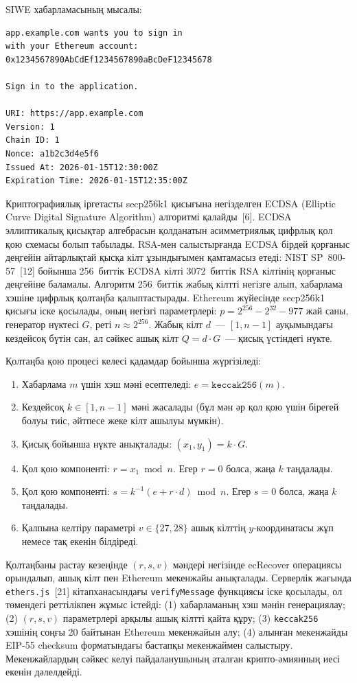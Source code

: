 \documentclass[14pt,a4paper]{extarticle}
\begin{document}
SIWE хабарламасының мысалы:
\begin{verbatim}
app.example.com wants you to sign in
with your Ethereum account:
0x1234567890AbCdEf1234567890aBcDeF12345678

Sign in to the application.

URI: https://app.example.com
Version: 1
Chain ID: 1
Nonce: a1b2c3d4e5f6
Issued At: 2026-01-15T12:30:00Z
Expiration Time: 2026-01-15T12:35:00Z
\end{verbatim}

Криптографиялық іргетасты secp256k1 қисығына негізделген ECDSA (Elliptic Curve Digital Signature Algorithm) алгоритмі қалайды~[6]. ECDSA эллиптикалық қисықтар алгебрасын қолданатын асимметриялық цифрлық қол қою схемасы болып табылады. RSA-мен салыстырғанда ECDSA бірдей қорғаныс деңгейін айтарлықтай қысқа кілт ұзындығымен қамтамасыз етеді: NIST SP~800-57~[12] бойынша 256~биттік ECDSA кілті 3072~биттік RSA кілтінің қорғаныс деңгейіне баламалы. Алгоритм 256~биттік жабық кілтті негізге алып, хабарлама хэшіне цифрлық қолтаңба қалыптастырады. Ethereum жүйесінде secp256k1 қисығы іске қосылады, оның негізгі параметрлері: $p = 2^{256} - 2^{32} - 977$ жай саны, генератор нүктесі $G$, реті $n \approx 2^{256}$. Жабық кілт $d$~--- $[1, n-1]$ ауқымындағы кездейсоқ бүтін сан, ал сәйкес ашық кілт $Q = d \cdot G$~--- қисық үстіндегі нүкте.

Қолтаңба қою процесі келесі қадамдар бойынша жүргізіледі:
\begin{enumerate}[nosep]
\item Хабарлама $m$ үшін хэш мәні есептеледі: $e = \texttt{keccak256}(m)$.
\item Кездейсоқ $k \in [1, n-1]$ мәні жасалады (бұл мән әр қол қою үшін бірегей болуы тиіс, әйтпесе жеке кілт ашылуы мүмкін).
\item Қисық бойынша нүкте анықталады: $(x_1, y_1) = k \cdot G$.
\item Қол қою компоненті: $r = x_1 \bmod n$. Егер $r = 0$ болса, жаңа $k$ таңдалады.
\item Қол қою компоненті: $s = k^{-1}(e + r \cdot d) \bmod n$. Егер $s = 0$ болса, жаңа $k$ таңдалады.
\item Қалпына келтіру параметрі $v \in \{27, 28\}$ ашық кілттің $y$-координатасы жұп немесе тақ екенін білдіреді.
\end{enumerate}

Қолтаңбаны растау кезеңінде $(r, s, v)$ мәндері негізінде ecRecover операциясы орындалып, ашық кілт пен Ethereum мекенжайы анықталады. Серверлік жағында \texttt{ethers.js}~[21] кітапханасындағы \texttt{verifyMessage} функциясы іске қосылады, ол төмендегі реттілікпен жұмыс істейді: (1) хабарламаның хэш мәнін генерациялау; (2) $(r, s, v)$ параметрлері арқылы ашық кілтті қайта құру; (3) \texttt{keccak256} хэшінің соңғы 20 байтынан Ethereum мекенжайын алу; (4) алынған мекенжайды EIP-55 checksum форматындағы бастапқы мекенжаймен салыстыру. Мекенжайлардың сәйкес келуі пайдаланушының аталған крипто-әмиянның иесі екенін дәлелдейді.
\end{document}
